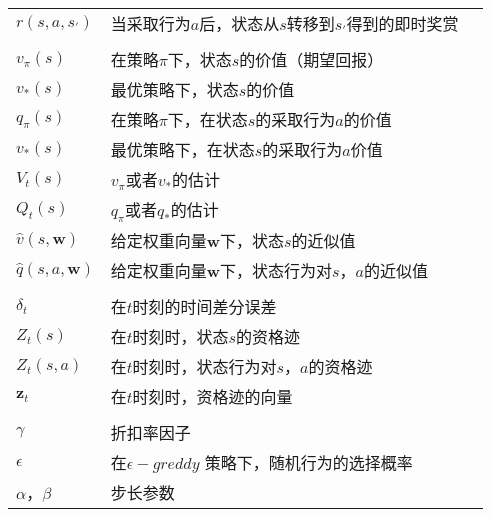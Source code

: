 \begin{longtable}{|l|l|l|}
$r(s,a,s_{'})$      &   当采取行为$a$后，状态从$s$转移到$s_{'}$得到的即时奖赏\\
                            &                                         \\
$v_{\pi}(s)$     & 在策略$\pi$下，状态$s$的价值（期望回报）             \\
$v_{*}(s)$     & 最优策略下，状态$s$的价值    \\
$q_{\pi}(s)$     & 在策略$\pi$下，在状态$s$的采取行为$a$的价值             \\
$v_{*}(s)$     & 最优策略下，在状态$s$的采取行为$a$价值    \\
$V_{t}(s)$     & $v_{\pi}$或者$v_{*}$的估计             \\
$Q_{t}(s)$     & $q_{\pi}$或者$q_{*}$的估计    \\
$\hat{v}(s,\bm{w})$     & 给定权重向量$\bm{w}$下，状态$s$的近似值         \\
$\hat{q}(s,a,\bm{w})$     & 给定权重向量$\bm{w}$下，状态行为对$s$，$a$的近似值     \\
                            &                                         \\
$\delta_{t}$     & 在$t$时刻的时间差分误差    \\
$Z_{t}(s)$     &  在$t$时刻时，状态$s$的资格迹             \\
$Z_{t}(s,a)$     & 在$t$时刻时，状态行为对$s$，$a$的资格迹    \\
$\bm{z}_{t}$     & 在$t$时刻时，资格迹的向量    \\
                            &                                         \\
$\gamma$     & 折扣率因子    \\
$\epsilon$     & 在$\epsilon-greddy$ 策略下，随机行为的选择概率         \\
$\alpha$，$\beta$     & 步长参数  \\

  \hline
\end{longtable}
